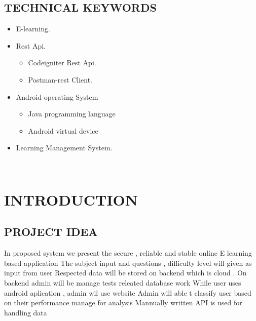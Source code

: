 \documentclass[oneside,a4paper,12pt]{report}
\begin{document}
{\section{TECHNICAL KEYWORDS}
\begin{itemize}
\item E-learning.
\item Rest Api.
\begin{itemize}
\item Codeigniter Rest Api.
\item Postman-rest Client.
\end{itemize}
\item Android operating System 
\begin{itemize}
\item Java programming language
\item Android virtual device
\end{itemize}
\item Learning Management System.
\end{itemize}
\\
			
\chapter{INTRODUCTION}
\newpage
\section{PROJECT IDEA}
\hspace*{0.3in}  In proposed system we present the secure , reliable and stable online E learning based application The subject input and questions , difficulty level will given as input from user Respected data will be stored on backend which is cloud . On backend admin will be manage tests releated database work While user uses android aplication , admin wil use website Admin will able t classify user based on their performance manage for analysis Mannually written API is used for handling data
\\
 
}
\end{document}
